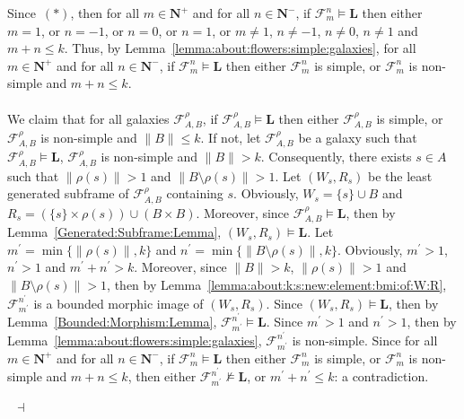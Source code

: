 \documentclass[draft]{article}
\newenvironment{proof}{{\bf Proof:}}{~$\dashv$\\}
\def\L{\mathbf{L}}
\begin{document}
\begin{proof}
%
%
Since~$(\ast)$, then for all $m{\in}\mathbf{N}^{+}$ and for all $n{\in}\mathbf{N}^{-}$, if ${\mathcal F}_{m}^{n}{\models}\L$ then either $m{=}1$, or $n{=}{-}1$, or $n{=}0$, or $n{=}1$, or $m{\not=}1$, $n{\not=}{-}1$, $n{\not=}0$, $n{\not=}1$ and $m{+}n{\leq}k$.
Thus, by Lemma~\ref{lemma:about:flowers:simple:galaxies}, for all $m{\in}\mathbf{N}^{+}$ and for all $n{\in}\mathbf{N}^{-}$, if ${\mathcal F}_{m}^{n}{\models}\L$ then either ${\mathcal F}_{m}^{n}$ is simple, or ${\mathcal F}_{m}^{n}$ is non-simple and $m{+}n{\leq}k$.
%
%
\\
\\
%
%
We claim that for all galaxies ${\mathcal F}_{A,B}^{\rho}$, if ${\mathcal F}_{A,B}^{\rho}{\models}\L$ then either ${\mathcal F}_{A,B}^{\rho}$ is simple, or ${\mathcal F}_{A,B}^{\rho}$ is non-simple and ${\parallel}B{\parallel}{\leq}k$.
If not, let ${\mathcal F}_{A,B}^{\rho}$ be a galaxy such that ${\mathcal F}_{A,B}^{\rho}{\models}\L$, ${\mathcal F}_{A,B}^{\rho}$ is non-simple and ${\parallel}B{\parallel}{>}k$.
Consequently, there exists $s{\in}A$ such that ${\parallel}\rho(s){\parallel}{>}1$ and ${\parallel}B{\setminus}\rho(s){\parallel}{>}1$.
Let $(W_{s},R_{s})$ be the least generated subframe of ${\mathcal F}_{A,B}^{\rho}$ containing $s$.
Obviously, $W_{s}{=}\{s\}{\cup}B$ and $R_{s}{=}(\{s\}{\times}\rho(s)){\cup}(B{\times}B)$.
Moreover, since ${\mathcal F}_{A,B}^{\rho}{\models}\L$, then by Lemma~\ref{Generated:Subframe:Lemma}, $(W_{s},R_{s}){\models}\L$.
Let $m^{\prime}{=}\min\{{\parallel}\rho(s){\parallel},k\}$ and $n^{\prime}{=}\min\{{\parallel}B{\setminus}\rho(s){\parallel},k\}$.
Obviously, $m^{\prime}{>}1$, $n^{\prime}{>}1$ and $m^{\prime}{+}n^{\prime}{>}k$.
Moreover, since ${\parallel}B{\parallel}{>}k$, ${\parallel}\rho(s){\parallel}{>}1$ and ${\parallel}B{\setminus}\rho(s){\parallel}{>}1$, then by Lemma~\ref{lemma:about:k:s:new:element:bmi:of:W:R}, ${\mathcal F}_{m^{\prime}}^{n^{\prime}}$ is a bounded morphic image of $(W_{s},R_{s})$.
Since $(W_{s},R_{s}){\models}\L$, then by Lemma~\ref{Bounded:Morphism:Lemma}, ${\mathcal F}_{m^{\prime}}^{n^{\prime}}{\models}\L$.
Since $m^{\prime}{>}1$ and $n^{\prime}{>}1$, then by Lemma~\ref{lemma:about:flowers:simple:galaxies}, ${\mathcal F}_{m^{\prime}}^{n^{\prime}}$ is non-simple.
Since for all $m{\in}\mathbf{N}^{+}$ and for all $n{\in}\mathbf{N}^{-}$, if ${\mathcal F}_{m}^{n}{\models}\L$ then either ${\mathcal F}_{m}^{n}$ is simple, or ${\mathcal F}_{m}^{n}$ is non-simple and $m{+}n{\leq}k$, then either ${\mathcal F}_{m^{\prime}}^{n^{\prime}}{\not\models}\L$, or $m^{\prime}{+}n^{\prime}{\leq}k$: a contradiction.

\end{proof}
\end{document}

